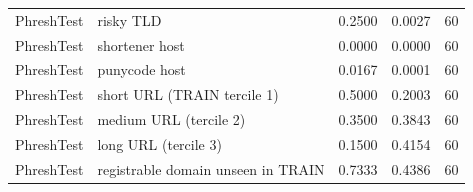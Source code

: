 \begin{table}[t]
\begin{tabular}{llrrr}
PhreshTest & risky TLD & 0.2500 & 0.0027 & 60 \\
PhreshTest & shortener host & 0.0000 & 0.0000 & 60 \\
PhreshTest & punycode host & 0.0167 & 0.0001 & 60 \\
PhreshTest & short URL (TRAIN tercile 1) & 0.5000 & 0.2003 & 60 \\
PhreshTest & medium URL (tercile 2) & 0.3500 & 0.3843 & 60 \\
PhreshTest & long URL (tercile 3) & 0.1500 & 0.4154 & 60 \\
PhreshTest & registrable domain unseen in TRAIN & 0.7333 & 0.4386 & 60 \\
\bottomrule
\end{tabular}
\end{table}